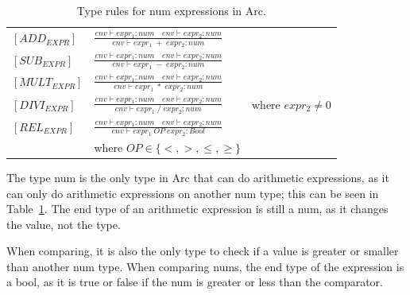\begin{table}[htb!]
    \centering
    \begin{tabular}{lll}
        \toprule
        $[ADD_{EXPR}] $                         & $\frac
            {env\vdash expr_1: num \quad env\vdash expr_2: num}
            {env\vdash expr_1 \;+\;expr_2: num}$
        \\ [12pt]
        $[SUB_{EXPR}] $                         & $\frac
            {env\vdash expr_1: num \quad env\vdash expr_2: num}
            {env\vdash expr_1 \;-\;expr_2: num}$
        \\ [12pt]
        $[MULT_{EXPR}] $                        & $\frac
            {env\vdash expr_1: num \quad env\vdash expr_2: num}
            {env\vdash expr_1 \;*\;expr_2: num}$
        \\ [12pt]
        $[DIVI_{EXPR}] $                        & $\frac
            {env\vdash expr_1: num \quad env\vdash expr_2: num}
        {env\vdash expr_1 \; / \; expr_2: num}$ & where $expr_2 \neq 0$
        \\ [12pt]
        $[REL_{EXPR}] $                         & $\frac
            {env\vdash expr_1: num \quad env\vdash expr_2: num}
            {env\vdash expr_1 \; OP \; expr_2: Bool}$                                 \\

                                                & where $OP \in \{<, >, \leq, \geq\}$

        \\
        \bottomrule
    \end{tabular}
    \caption{Type rules for num expressions in Arc.}
    \label{tab:num-rules}
\end{table}


The type num is the only type in Arc that can do arithmetic expressions, as it can only do arithmetic expressions on another num type; this can be seen in Table~\ref{tab:num-rules}. The end type of an arithmetic expression is still a num, as it changes the value, not the type.

When comparing, it is also the only type to check if a value is greater or smaller than another num type. When comparing nums, the end type of the expression is a bool, as it is true or false if the num is greater or less than the comparator.


